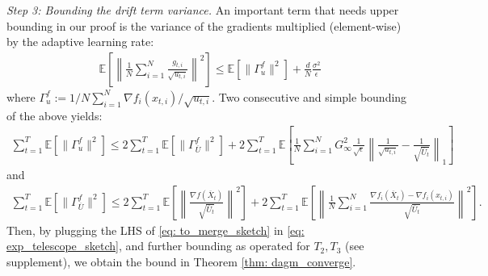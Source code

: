 \documentclass{article} %
\begin{document}
\textsl{Step 3: Bounding the drift term variance.}\hspace{0.01in} An important term that needs upper bounding in our proof is the variance of the gradients multiplied (element-wise) by the adaptive learning rate:
 {\small 
 \begin{align}\label{eq: split_var_sketch}
 \mathbb E\left[ \left\| \frac{1}{N} \sum_{i=1}^N \frac{g_{t,i}}{\sqrt{u_{t,i}}} \right\|^2 \right]  \leq   \mathbb E [\| \Gamma_{u}^f\|^2 ] + \frac{d}{N}  
 \frac{ \sigma^2 }{\epsilon} 
 \end{align}
 }%
 where $ \Gamma_{u}^f := 1/N \sum_{i=1}^N \nabla f_i(x_{t,i})/\sqrt{u_{t,i}} $. Two consecutive and simple bounding of the above yields:
 {\small
 \begin{align}\label{eq: variance_bound_1_sketch}
 \sum_{t=1}^T \mathbb E [  \|\Gamma_{u}^f\|^2 ]  
  \leq  2\sum_{t=1}^T \mathbb E [\|\Gamma_{\overline{U}}^f \|^2] + 2 \sum_{t=1}^T \mathbb E \left[  \frac{1}{N} \sum_{i=1}^N G_{\infty}^2  \frac{1}{\sqrt{\epsilon}}\left\|     \frac{1}{\sqrt{u_{t,i}}} - \frac{1}{\sqrt{\overline U_{t}}}  \right\|_1     \right]
 \end{align}
 }%
 and
 {\small
 \begin{align}\label{eq: to_merge_sketch}
 \sum_{t=1}^T \mathbb E [\|\Gamma_{\overline{U}}^f \|^2]  
 \leq  2 \sum_{t=1}^T \mathbb E \left[  \left\| \frac{\nabla f(\overline X_{t})}{\sqrt{\overline U_t}  } \right\|^2 \right] 
+ 2 \sum_{t=1}^T \mathbb E \left[  \left\|\frac{1}{N} \sum_{i=1}^N \frac{\nabla f_i(\overline X_t) - \nabla f_i(x_{t,i})}{\sqrt{\overline U_t}  } \right\|^2 \right].
 \end{align}
 }%
Then, by plugging the LHS of \eqref{eq: to_merge_sketch} in \eqref{eq: exp_telescope_sketch}, and further bounding as operated for $T_2, T_3$ (see supplement), we obtain the bound in Theorem \ref{thm: dagm_converge}.
\end{document}
